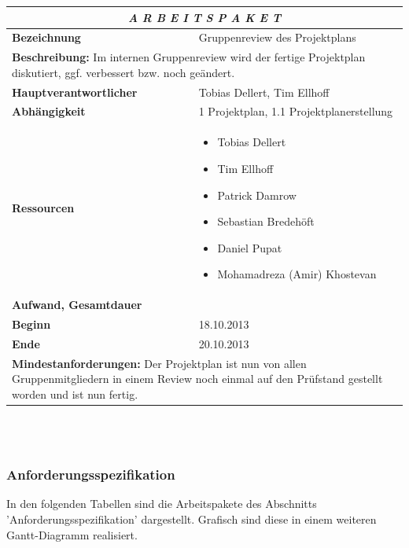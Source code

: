 \documentclass[fontsize=12pt,paper=a4,twoside]{scrartcl}
\begin{document}
\begin{tabular}{p{7.5cm}|p{7.5cm}}\toprule
\multicolumn{2}{c}{\textbf{\textit{A R B E I T S P A K E T \quad 1.2}}} \\ \toprule \hline
\textbf{Bezeichnung} & Gruppenreview des Projektplans\\\hline
\multicolumn{2}{p{15cm}}{\textbf{Beschreibung:} \newline 
Im internen Gruppenreview wird der fertige Projektplan diskutiert, ggf. verbessert bzw. noch geändert.}  \\\hline
\textbf{Hauptverantwortlicher} & Tobias Dellert, Tim Ellhoff \\\hline
\textbf{Abhängigkeit} & 1 Projektplan, 1.1 Projektplanerstellung\\\hline
\textbf{Ressourcen} & \begin{itemize}
\itemsep0pt
\item Tobias Dellert
\item Tim Ellhoff
\item Patrick Damrow
\item Sebastian Bredehöft
\item Daniel Pupat
\item Mohamadreza (Amir) Khostevan
\end{itemize} \\\hline
\textbf{Aufwand, Gesamtdauer} & \\\hline
\textbf{Beginn} & 18.10.2013 \\\hline
\textbf{Ende} & 20.10.2013\\\hline
\multicolumn{2}{p{15cm}}{\textbf{Mindestanforderungen: } \newline
Der Projektplan ist nun von allen Gruppenmitgliedern in einem Review noch einmal auf den Prüfstand gestellt worden und ist nun fertig. }  \\ \toprule
\end{tabular} \\\\

\subsubsection{Anforderungsspezifikation}\label{aps}

In den folgenden Tabellen sind die Arbeitspakete des Abschnitts 'Anforderungsspezifikation' dargestellt. Grafisch sind diese in einem weiteren Gantt-Diagramm realisiert.
\end{document}
